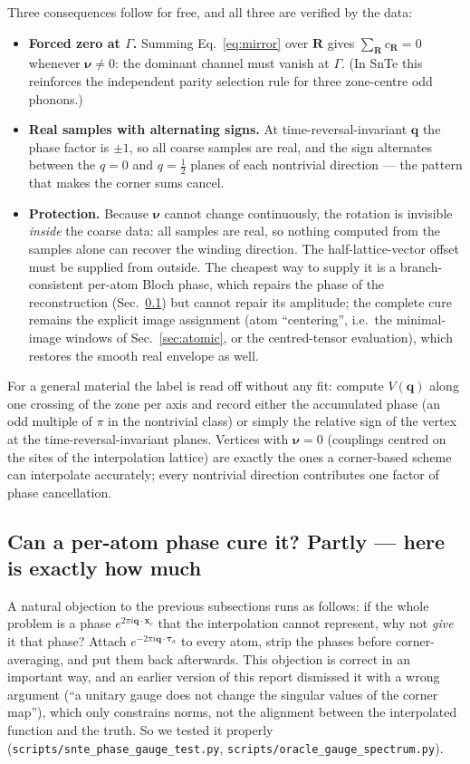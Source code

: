 \documentclass[11pt,a4paper]{article}
\newcommand{\qv}{\mathbf{q}}
\begin{document}
Three consequences follow for free, and all three are verified by the
data:
\begin{itemize}
\item \textbf{Forced zero at $\Gamma$.}  Summing
  Eq.~\eqref{eq:mirror} over $\mathbf R$ gives $\sum_{\mathbf R}
  c_{\mathbf R}=0$ whenever $\boldsymbol\nu\neq0$: the dominant channel
  must vanish at $\Gamma$.  (In SnTe this reinforces the independent
  parity selection rule for three zone-centre odd phonons.)
\item \textbf{Real samples with alternating signs.}  At
  time-reversal-invariant $\qv$ the phase factor is $\pm1$, so all
  coarse samples are real, and the sign alternates between the $q=0$
  and $q=\frac12$ planes of each nontrivial direction --- the pattern
  that makes the corner sums cancel.
\item \textbf{Protection.}  Because $\boldsymbol\nu$ cannot change
  continuously, the rotation is invisible \emph{inside} the coarse
  data: all samples are real, so nothing computed from the samples
  alone can recover the winding direction.  The half-lattice-vector
  offset must be supplied from outside.  The cheapest way to supply it
  is a branch-consistent per-atom Bloch phase, which repairs the phase
  of the reconstruction (Sec.~\ref{sec:topo-gauge}) but cannot repair
  its amplitude; the complete cure remains the explicit image
  assignment (atom ``centering'', i.e.\ the minimal-image windows of
  Sec.~\ref{sec:atomic}, or the centred-tensor evaluation), which
  restores the smooth real envelope as well.
\end{itemize}

For a general material the label is read off without any fit: compute
$V(\qv)$ along one crossing of the zone per axis and record either the
accumulated phase (an odd multiple of $\pi$ in the nontrivial class) or
simply the relative sign of the vertex at the time-reversal-invariant
planes.  Vertices with $\boldsymbol\nu=0$ (couplings centred on the
sites of the interpolation lattice) are exactly the ones a corner-based
scheme can interpolate accurately; every nontrivial direction
contributes one factor of phase cancellation.

\subsection{Can a per-atom phase cure it?  Partly --- here is exactly
how much}
\label{sec:topo-gauge}

A natural objection to the previous subsections runs as follows: if
the whole problem is a phase $e^{2\pi i\qv\cdot\mathbf x_c}$ that the
interpolation cannot represent, why not \emph{give} it that phase?
Attach $e^{-2\pi i\qv\cdot\boldsymbol\tau_a}$ to every atom, strip the
phases before corner-averaging, and put them back afterwards.  This
objection is correct in an important way, and an earlier version of
this report dismissed it with a wrong argument (``a unitary gauge does
not change the singular values of the corner map''), which only
constrains norms, not the alignment between the interpolated function
and the truth.  So we tested it properly
(\texttt{scripts/snte\_phase\_gauge\_test.py},
\texttt{scripts/oracle\_gauge\_spectrum.py}).
\end{document}
